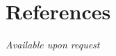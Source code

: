 \documentclass[11pt,a4paper,sans]{moderncv}        %
\begin{document}
\renewcommand{\refname}{Conference Publications}
\nocite{*}


\section{References}
\textit{Available upon request}

%
%
\end{document}
